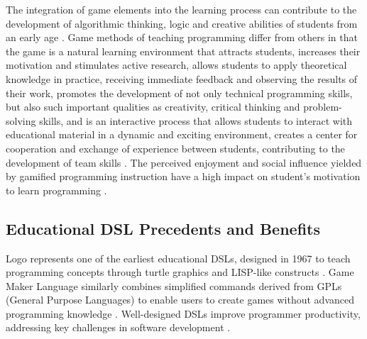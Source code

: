 The integration of game elements into the learning process can contribute to the development of algorithmic thinking, logic and creative abilities of students from an early age \cite{medvedieva_use_2021}. 
Game methods of teaching programming differ from others in that the game is a natural learning environment that attracts students, increases their motivation and stimulates active research, allows students to apply theoretical knowledge in practice, receiving immediate feedback and observing the results of their work, promotes the development of not only technical programming skills, but also such important qualities as creativity, critical thinking and problem-solving skills, and is an interactive process that allows students to interact with educational material in a dynamic and exciting environment, creates a center for cooperation and exchange of experience between students, contributing to the development of team skills \cite{moshkova_gamification_2024}. 
The perceived enjoyment and social influence yielded by gamified programming instruction have a high impact on student's motivation to learn programming \cite{faculty_of_education_in_jagodina_university_of_kragujevac_serbia_exploring_2025}.

\subsection{Educational DSL Precedents and Benefits}

Logo represents one of the earliest educational DSLs, designed in 1967 to teach programming concepts through turtle graphics and LISP-like constructs \cite{noauthor_domain-specific_nodate}. 
Game Maker Language similarly combines simplified commands derived from GPLs (General Purpose Languages) to enable users to create games without advanced programming knowledge \cite{noauthor_domain-specific_nodate}. 
Well-designed DSLs improve programmer productivity, addressing key challenges in software development \cite{fowler_domain-specific_2011}.
